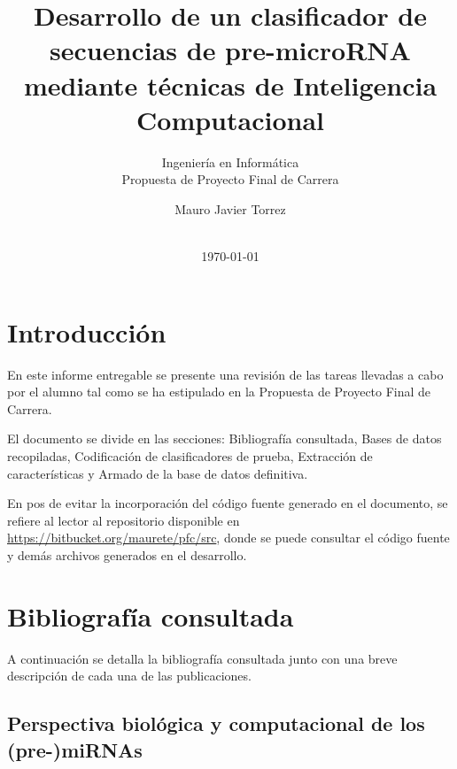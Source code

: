 \documentclass[12pt,bibliography=oldstyle,DIV=12,parskip=half-]{scrartcl}
\begin{document}
%
\begin{titlepage}
%
\titlehead{\center Universidad Nacional del Litoral\\
  Facultad de Ingeniería y Ciencias Hídricas}
%
\subtitle{Ingeniería en Informática\\
  Propuesta de Proyecto Final de Carrera}
%
\title{Desarrollo de un clasificador de secuencias de pre-microRNA
  mediante técnicas de Inteligencia Computacional}
\subject{Informe entregable 1}
\author{Mauro Javier Torrez}
%
\publishers{\-\\[4em]{Director\\Dr. Diego H. Milone}%
}
%
\date{\-\\[2em]\today}
%
\renewcommand*{\titlepagestyle}{empty}
\maketitle
\end{titlepage}
\setcounter{page}{1}
%
%
%
%
\section{Introducción}
En este informe entregable se presente una revisión de las tareas
llevadas a cabo por el alumno tal como se ha estipulado en la
Propuesta de Proyecto Final de Carrera.

El documento se divide en las secciones: Bibliografía consultada,
Bases de datos recopiladas, Codificación de clasificadores de prueba,
Extracción de características y Armado de la base de datos definitiva.

En pos de evitar la incorporación del código fuente generado en el
documento, se refiere al lector al repositorio disponible en
\url{https://bitbucket.org/maurete/pfc/src}, donde se puede consultar
el código fuente y demás archivos generados en el desarrollo.
%
%
%
%
\section{Bibliografía consultada}
%
A continuación se detalla la bibliografía consultada junto con una
breve descripción de cada una de las publicaciones.
%
\subsection{Perspectiva biológica y computacional de los (pre-)miRNAs}
\end{document}
